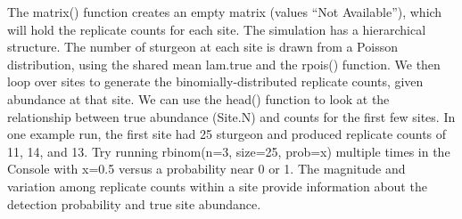 \documentclass[
]{krantz}
\begin{document}
The matrix() function creates an empty matrix (values ``Not Available''), which will hold the replicate counts for each site. The simulation has a hierarchical structure. The number of sturgeon at each site is drawn from a Poisson distribution, using the shared mean lam.true and the rpois() function. We then loop over sites to generate the binomially-distributed replicate counts, given abundance at that site. We can use the head() function to look at the relationship between true abundance (Site.N) and counts for the first few sites. In one example run, the first site had 25 sturgeon and produced replicate counts of 11, 14, and 13. Try running rbinom(n=3, size=25, prob=x) multiple times in the Console with x=0.5 versus a probability near 0 or 1. The magnitude and variation among replicate counts within a site provide information about the detection probability and true site abundance.
\end{document}
